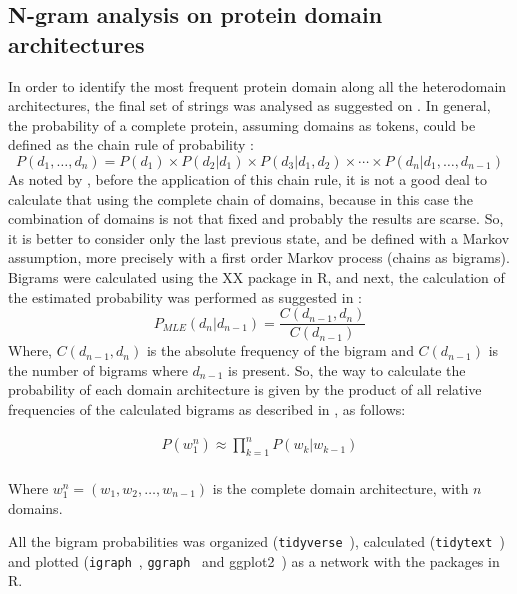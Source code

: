 \documentclass[11pt]{article}
\begin{document}
\subsection*{N-gram analysis on protein domain architectures}
In order to identify the most frequent protein domain along all the heterodomain
architectures, the final set of strings was analysed as suggested on \cite{Yu:2019}.
In general, the probability of a complete protein, assuming domains as tokens, could be
defined as the chain rule of probability \cite{Jurafsky:2018Book}:
\begin{equation}\label{eqProbAll}
P(d_1,\ldots,d_n) = P(d_1) \times P(d_2|d_1) \times P(d_3|d_1,d_2) \times \cdots \times P(d_n|d_1, \ldots , d_{n-1})
\end{equation}
As noted by \cite{Yu:2019}, before the application of this chain rule, 
it is not a good deal to calculate that using the complete chain of domains, because in this case
the combination of domains is not that fixed and probably the results are scarse. So, 
it is better to consider only the last previous state, and be defined with a Markov assumption,
more precisely with a first order Markov process (chains as bigrams). 
Bigrams were calculated using the XX package \cite{} in R, and next, the calculation of the estimated
probability was performed as suggested in \cite{Yu:2019}:
\begin{equation}\label{eqEST}
P_{MLE} (d_n|d_{n-1}) = \frac{C (d_{n-1},d_n)}{ C (d_{n-1})}
\end{equation}
Where, $C(d_{n-1},d_n)$ is the absolute frequency of the bigram and $C(d_{n-1})$ is the number
of bigrams where $d_{n-1}$ is present. So, the way to calculate the probability of 
each domain architecture is given by the product of all relative frequencies of the 
calculated bigrams as described in \cite{Jurafsky:2018Book}, as follows:

\begin{equation}\label{eqFinalProd}
  \begin{split}
    P(w_1^n) \approx \prod_{k=1}^n P(w_k|w_{k-1}) \\ %
  \end{split}
\end{equation}

Where $w_1^n = (w_1, w_2, \dots, w_{n-1})$ is the complete domain architecture, with $n$ domains.

All the bigram probabilities was organized (\texttt{tidyverse}~\cite{wickham:2017}), calculated 
(\texttt{tidytext}~\cite{Wickham:2016}) and plotted (\texttt{igraph}~\cite{Csardi:2006}, 
\texttt{ggraph}~\cite{Pedersen:2018} and ggplot2~\cite{Wickham:2016a}) as a network with the packages in R.
\end{document}
